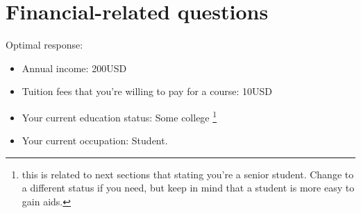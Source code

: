 \chapter{Financial-related questions}

Optimal response:

\begin{itemize}
\item Annual income: 200USD
\item Tuition fees that you're willing to pay for a course: 10USD
\item Your current education status: Some college \footnote{this is related to next sections that stating you're a senior student. Change to a different status if you need, but keep in mind that a student is more easy to gain aids.}
\item Your current occupation: Student.
\end{itemize}